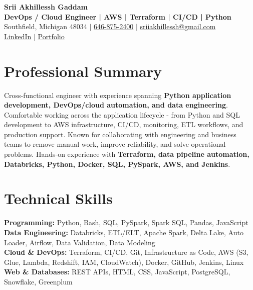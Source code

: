 \documentclass[letterpaper,10pt]{article}
\begin{document}
\fontsize{9.35pt}{10.45pt}\selectfont

\begin{center}
    {\LARGE \textbf{Srii Akhillessh Gaddam}} \\[-1pt]
    \textbf{DevOps / Cloud Engineer | AWS | Terraform | CI/CD | Python} \\[2pt]
    Southfield, Michigan 48034 $|$
    \href{tel:6468752400}{646-875-2400} $|$
    \href{mailto:sriiakhillessh@gmail.com}{sriiakhillessh@gmail.com} \\[1pt]
    \href{https://www.linkedin.com/in/srii-akhiilessh-gaddam-b48668191/}{LinkedIn} $|$
    \href{https://sriiakhillesshg.github.io/portfolio/}{Portfolio}
\end{center}
\vspace{-8pt}

\section{Professional Summary}
\small{Cross-functional engineer with experience spanning \textbf{Python application development, DevOps/cloud automation, and data engineering}. Comfortable working across the application lifecycle - from Python and SQL development to AWS infrastructure, CI/CD, monitoring, ETL workflows, and production support. Known for collaborating with engineering and business teams to remove manual work, improve reliability, and solve operational problems. Hands-on experience with \textbf{Terraform, data pipeline automation, Databricks, Python, Docker, SQL, PySpark, AWS, and Jenkins}.}

\section{Technical Skills}
\small{
\textbf{Programming:} Python, Bash, SQL, PySpark, Spark SQL, Pandas, JavaScript \\
\textbf{Data Engineering:} Databricks, ETL/ELT, Apache Spark, Delta Lake, Auto Loader, Airflow, Data Validation, Data Modeling \\
\textbf{Cloud \& DevOps:} Terraform, CI/CD, Git, Infrastructure as Code, AWS (S3, Glue, Lambda, Redshift, IAM, CloudWatch), Docker, GitHub, Jenkins, Linux \\
\textbf{Web \& Databases:} REST APIs, HTML, CSS, JavaScript, PostgreSQL, Snowflake, Greenplum
}
\end{document}

